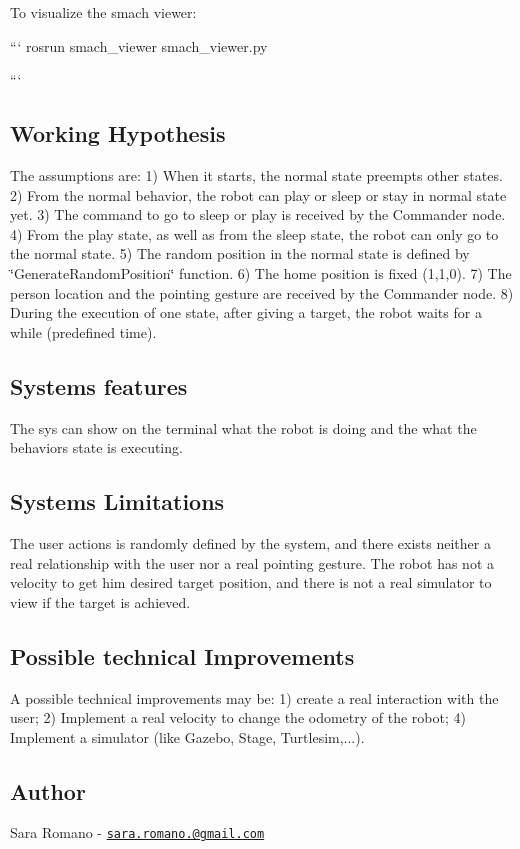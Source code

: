 To visualize the smach viewer\+: \begin{DoxyVerb}```
rosrun smach_viewer smach_viewer.py

```
\end{DoxyVerb}


\subsection*{Working Hypothesis}

The assumptions are\+: 1) When it starts, the normal state preempts other states. 2) From the normal behavior, the robot can play or sleep or stay in normal state yet. 3) The command to go to sleep or play is received by the Commander node. 4) From the play state, as well as from the sleep state, the robot can only go to the normal state. 5) The random position in the normal state is defined by \char`\"{}\+Generate\+Random\+Position\char`\"{} function. 6) The home position is fixed (1,1,0). 7) The person location and the pointing gesture are received by the Commander node. 8) During the execution of one state, after giving a target, the robot waits for a while (predefined time).

\subsection*{System\textquotesingle{}s features}

The sys can show on the terminal what the robot is doing and the what the behavior\textquotesingle{}s state is executing.

\subsection*{System\textquotesingle{}s Limitations}

The user actions is randomly defined by the system, and there exists neither a real relationship with the user nor a real pointing gesture. The robot has not a velocity to get him desired target position, and there is not a real simulator to view if the target is achieved.

\subsection*{Possible technical Improvements}

A possible technical improvements may be\+: 1) create a real interaction with the user; 2) Implement a real velocity to change the odometry of the robot; 4) Implement a simulator (like Gazebo, Stage, Turtlesim,...).

\subsection*{Author}

Sara Romano -\/ \href{mailto:sara.romano.15@gmail.com}{\tt sara.\+romano.@gmail.\+com} 